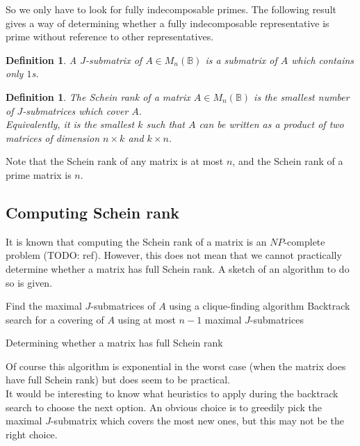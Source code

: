 \documentclass[11pt]{article}
\newtheorem{defi}[thm]{Definition}
\numberwithin{equation}{section}
\newcommand{\B}{\mathbb{B}}
\newcommand{\Bn}{M_n(\B)}
\begin{document}
So we only have to look for fully indecomposable primes. The following result gives a way of determining whether a fully indecomposable representative is prime without reference to other representatives.

\begin{defi}
  A $J$-submatrix of $A \in \Bn$ is a submatrix of $A$ which contains only $1$s.
\end{defi}

\begin{defi}
  The \emph{Schein rank} of a matrix $A \in \Bn$ is the smallest number of $J$-submatrices which cover $A$.\\
  Equivalently, it is the smallest $k$ such that $A$ can be written as a product of two matrices of dimension $n \times k$ and $k \times n$. 
\end{defi}
Note that the Schein rank of any matrix is at most $n$, and the Schein rank of a prime matrix is $n$.

\subsection*{Computing Schein rank}
It is known that computing the Schein rank of a matrix is an $NP$-complete problem (TODO: ref). However, this does not mean that we cannot practically determine whether a matrix has full Schein rank. A sketch of an algorithm to do so is given.

\begin{algorithm}
  \DontPrintSemicolon

  Find the maximal $J$-submatrices of $A$ using a clique-finding algorithm \; 
  Backtrack search for a covering of $A$ using at most $n - 1$ maximal $J$-submatrices \;
   \;
  \caption{Determining whether a matrix has full Schein rank}\label{alg:HasFullScheinRank}
\end{algorithm}

Of course this algorithm is exponential in the worst case (when the matrix does have full Schein rank) but does seem to be practical. \\
It would be interesting to know what heuristics to apply during the backtrack search to choose the next option. An obvious choice is to greedily pick the maximal $J$-submatrix which covers the most new ones, but this may not be the right choice.
\end{document}
